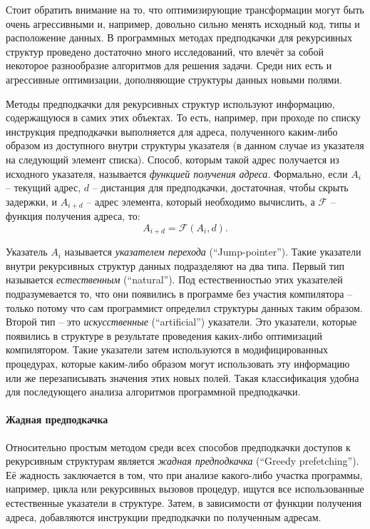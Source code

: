 \documentclass[12pt,a4paper]{article}
\begin{document}
Стоит обратить внимание на то, что оптимизирующие трансформации могут быть очень агрессивными и, например, довольно сильно менять исходный код, типы и расположение данных. В программных методах предподкачки для рекурсивных структур проведено достаточно много исследований, что влечёт за собой некоторое разнообразие алгоритмов для решения задачи. Среди них есть и агрессивные оптимизации, дополняющие структуры данных новыми полями.

Методы предподкачки для рекурсивных структур используют информацию, содержащуюся в самих этих объектах. То есть, например, при проходе по списку инструкция предподкачки выполняется для адреса, полученного каким-либо образом из доступного внутри структуры указателя (в данном случае из указателя на следующий элемент списка). Способ, которым такой адрес получается из исходного указателя, называется \emph{функцией получения адреса}\cite{LukPhd}\cite{LukRDS}. Формально, если $A_i$ -- текущий адрес, $d$ -- дистанция для предподкачки, достаточная, чтобы скрыть задержки, и $A_{i+d}$ -- адрес элемента, который необходимо вычислить, а $\mathcal{F}$ -- функция получения адреса, то:
\begin{displaymath}
  A_{i+d} = \mathcal{F}(A_i,d).
\end{displaymath}

Указатель $A_i$ называется \emph{указателем перехода} (``Jump-pointer''). Такие указатели внутри рекурсивных структур данных подразделяют на два типа. Первый тип называется \emph{естественным} (``natural''). Под естественностью этих указателей подразумевается то, что они появились в программе без участия компилятора -- только потому что сам программист определил структуры данных таким образом. Второй тип -- это \emph{искусственные} (``artificial'') указатели. Это указатели, которые появились в структуре в результате проведения каких-либо оптимизаций компилятором. Такие указатели затем используются в модифицированных процедурах, которые каким-либо образом могут использовать эту информацию или же перезаписывать значения этих новых полей. Такая классификация удобна для последующего анализа алгоритмов программной предподкачки.

\paragraph{Жадная предподкачка}

Относительно простым методом среди всех способов предподкачки доступов к рекурсивным структурам является \emph{жадная предподкачка} (``Greedy prefetching''). Её жадность заключается в том, что при анализе какого-либо участка программы, например, цикла или рекурсивных вызовов процедур, ищутся все использованные естественные указатели в структуре. Затем, в зависимости от функции получения адреса, добавляются инструкции предподкачки по полученным адресам.
\end{document}
